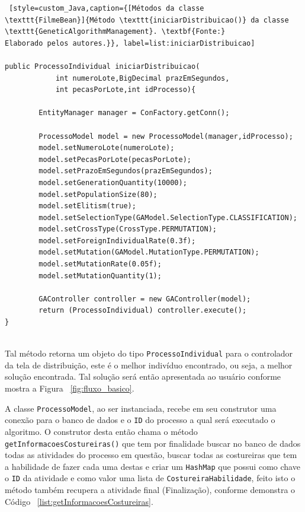 \begin{lstlisting} [style=custom_Java,caption={[Métodos da classe
\texttt{FilmeBean}]{Método \texttt{iniciarDistribuicao()} da classe \texttt{GeneticAlgorithmManagement}. \textbf{Fonte:}
Elaborado pelos autores.}}, label=list:iniciarDistribuicao]

public ProcessoIndividual iniciarDistribuicao(
			int numeroLote,BigDecimal prazEmSegundos,  
			int pecasPorLote,int idProcesso){

		EntityManager manager = ConFactory.getConn(); 
		
		ProcessoModel model = new ProcessoModel(manager,idProcesso);
		model.setNumeroLote(numeroLote);
		model.setPecasPorLote(pecasPorLote);
		model.setPrazoEmSegundos(prazEmSegundos);
		model.setGenerationQuantity(10000);
		model.setPopulationSize(80);
		model.setElitism(true);
		model.setSelectionType(GAModel.SelectionType.CLASSIFICATION);
		model.setCrossType(CrossType.PERMUTATION);
		model.setForeignIndividualRate(0.3f);
		model.setMutation(GAModel.MutationType.PERMUTATION);
		model.setMutationRate(0.05f);
		model.setMutationQuantity(1);

		GAController controller = new GAController(model);
		return (ProcessoIndividual) controller.execute();
}


\end{lstlisting}

\par Tal método retorna um objeto do tipo \texttt{ProcessoIndividual} para o controlador da tela de distribuição, este é o melhor indivíduo encontrado, ou seja, a melhor solução encontrada. Tal solução será então apresentada ao usuário conforme mostra a Figura ~\ref{fig:fluxo_basico}.

\par A classe \texttt{ProcessoModel}, ao ser instanciada, recebe em seu construtor uma conexão para o 
banco de dados e o \texttt{ID} do processo a qual será executado o algoritmo. O construtor desta então chama o método
\texttt{getInformacoesCostureiras()} que tem por finalidade buscar no banco de dados todas as atividades do processo em questão, 
buscar todas as costureiras que tem a habilidade de fazer cada uma destas e criar um \texttt{HashMap} que possui como chave o 
\texttt{ID} da atividade e como valor uma lista de \texttt{CostureiraHabilidade}, feito isto o método também recupera  a 
atividade final (Finalização), conforme demonstra o Código ~\ref{list:getInformacoesCostureiras}.


